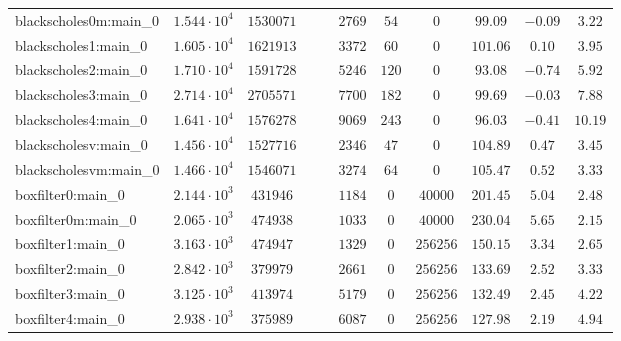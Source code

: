 \begin{tabular}{|l|c|c|c|c|c|c|c|c|c|c|}
blackscholes0m:main\_0         & $ 1.544 \cdot 10^{4} $ & $ 1530071  $ & $  $ & $    $ & $ 2769   $ & $ 54   $ & $ 0        $ & $ 99.09       $ & $ -0.09   $ & $ 3.22    $ \\
blackscholes1:main\_0          & $ 1.605 \cdot 10^{4} $ & $ 1621913  $ & $  $ & $    $ & $ 3372   $ & $ 60   $ & $ 0        $ & $ 101.06      $ & $ 0.10    $ & $ 3.95    $ \\
blackscholes2:main\_0          & $ 1.710 \cdot 10^{4} $ & $ 1591728  $ & $  $ & $    $ & $ 5246   $ & $ 120  $ & $ 0        $ & $ 93.08       $ & $ -0.74   $ & $ 5.92    $ \\
blackscholes3:main\_0          & $ 2.714 \cdot 10^{4} $ & $ 2705571  $ & $  $ & $    $ & $ 7700   $ & $ 182  $ & $ 0        $ & $ 99.69       $ & $ -0.03   $ & $ 7.88    $ \\
blackscholes4:main\_0          & $ 1.641 \cdot 10^{4} $ & $ 1576278  $ & $  $ & $    $ & $ 9069   $ & $ 243  $ & $ 0        $ & $ 96.03       $ & $ -0.41   $ & $ 10.19   $ \\
blackscholesv:main\_0          & $ 1.456 \cdot 10^{4} $ & $ 1527716  $ & $  $ & $    $ & $ 2346   $ & $ 47   $ & $ 0        $ & $ 104.89      $ & $ 0.47    $ & $ 3.45    $ \\
blackscholesvm:main\_0         & $ 1.466 \cdot 10^{4} $ & $ 1546071  $ & $  $ & $    $ & $ 3274   $ & $ 64   $ & $ 0        $ & $ 105.47      $ & $ 0.52    $ & $ 3.33    $ \\
boxfilter0:main\_0             & $ 2.144 \cdot 10^{3} $ & $ 431946   $ & $  $ & $    $ & $ 1184   $ & $ 0    $ & $ 40000    $ & $ 201.45      $ & $ 5.04    $ & $ 2.48    $ \\
boxfilter0m:main\_0            & $ 2.065 \cdot 10^{3} $ & $ 474938   $ & $  $ & $    $ & $ 1033   $ & $ 0    $ & $ 40000    $ & $ 230.04      $ & $ 5.65    $ & $ 2.15    $ \\
boxfilter1:main\_0             & $ 3.163 \cdot 10^{3} $ & $ 474947   $ & $  $ & $    $ & $ 1329   $ & $ 0    $ & $ 256256   $ & $ 150.15      $ & $ 3.34    $ & $ 2.65    $ \\
boxfilter2:main\_0             & $ 2.842 \cdot 10^{3} $ & $ 379979   $ & $  $ & $    $ & $ 2661   $ & $ 0    $ & $ 256256   $ & $ 133.69      $ & $ 2.52    $ & $ 3.33    $ \\
boxfilter3:main\_0             & $ 3.125 \cdot 10^{3} $ & $ 413974   $ & $  $ & $    $ & $ 5179   $ & $ 0    $ & $ 256256   $ & $ 132.49      $ & $ 2.45    $ & $ 4.22    $ \\
boxfilter4:main\_0             & $ 2.938 \cdot 10^{3} $ & $ 375989   $ & $  $ & $    $ & $ 6087   $ & $ 0    $ & $ 256256   $ & $ 127.98      $ & $ 2.19    $ & $ 4.94    $ \\

\end{tabular}
